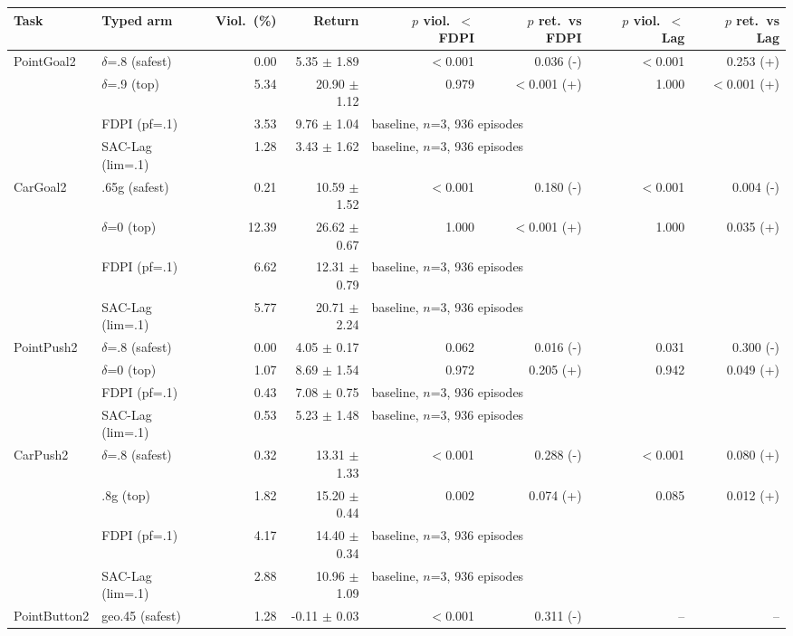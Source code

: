 \begin{tabular}{llrrrrrr}
\toprule
Task & Typed arm & Viol.\ (\%) & Return & $p$ viol.\ $<$ FDPI & $p$ ret.\ vs FDPI & $p$ viol.\ $<$ Lag & $p$ ret.\ vs Lag \\
\midrule
PointGoal2 & $\delta$=.8 (safest) & 0.00 & 5.35 $\pm$ 1.89 & $<$0.001 & 0.036 (-) & $<$0.001 & 0.253 (+) \\
 & $\delta$=.9 (top) & 5.34 & 20.90 $\pm$ 1.12 & 0.979 & $<$0.001 (+) & 1.000 & $<$0.001 (+) \\
 & FDPI (pf=.1) & 3.53 & 9.76 $\pm$ 1.04 & \multicolumn{4}{l}{baseline, $n$=3, 936 episodes} \\
 & SAC-Lag (lim=.1) & 1.28 & 3.43 $\pm$ 1.62 & \multicolumn{4}{l}{baseline, $n$=3, 936 episodes} \\
\midrule
CarGoal2 & .65g (safest) & 0.21 & 10.59 $\pm$ 1.52 & $<$0.001 & 0.180 (-) & $<$0.001 & 0.004 (-) \\
 & $\delta$=0 (top) & 12.39 & 26.62 $\pm$ 0.67 & 1.000 & $<$0.001 (+) & 1.000 & 0.035 (+) \\
 & FDPI (pf=.1) & 6.62 & 12.31 $\pm$ 0.79 & \multicolumn{4}{l}{baseline, $n$=3, 936 episodes} \\
 & SAC-Lag (lim=.1) & 5.77 & 20.71 $\pm$ 2.24 & \multicolumn{4}{l}{baseline, $n$=3, 936 episodes} \\
\midrule
PointPush2 & $\delta$=.8 (safest) & 0.00 & 4.05 $\pm$ 0.17 & 0.062 & 0.016 (-) & 0.031 & 0.300 (-) \\
 & $\delta$=0 (top) & 1.07 & 8.69 $\pm$ 1.54 & 0.972 & 0.205 (+) & 0.942 & 0.049 (+) \\
 & FDPI (pf=.1) & 0.43 & 7.08 $\pm$ 0.75 & \multicolumn{4}{l}{baseline, $n$=3, 936 episodes} \\
 & SAC-Lag (lim=.1) & 0.53 & 5.23 $\pm$ 1.48 & \multicolumn{4}{l}{baseline, $n$=3, 936 episodes} \\
\midrule
CarPush2 & $\delta$=.8 (safest) & 0.32 & 13.31 $\pm$ 1.33 & $<$0.001 & 0.288 (-) & $<$0.001 & 0.080 (+) \\
 & .8g (top) & 1.82 & 15.20 $\pm$ 0.44 & 0.002 & 0.074 (+) & 0.085 & 0.012 (+) \\
 & FDPI (pf=.1) & 4.17 & 14.40 $\pm$ 0.34 & \multicolumn{4}{l}{baseline, $n$=3, 936 episodes} \\
 & SAC-Lag (lim=.1) & 2.88 & 10.96 $\pm$ 1.09 & \multicolumn{4}{l}{baseline, $n$=3, 936 episodes} \\
\midrule
PointButton2 & geo.45 (safest) & 1.28 & -0.11 $\pm$ 0.03 & $<$0.001 & 0.311 (-) & -- & -- \\

\end{tabular}
